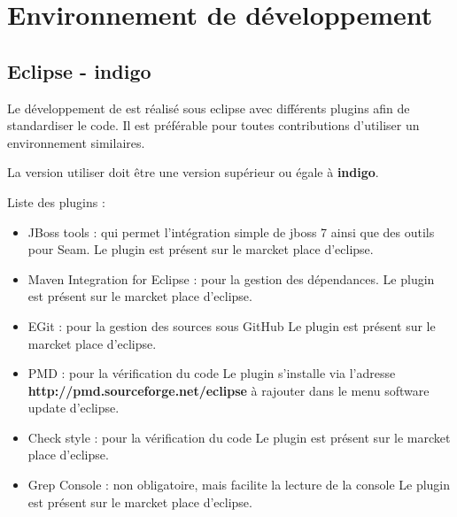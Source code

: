 \newpage{}
\chapter{Environnement de développement}

\section{Eclipse - indigo}
Le développement de \youTestIt{} est réalisé sous eclipse avec différents plugins afin de standardiser 
le code. Il est préférable pour toutes contributions d'utiliser un environnement similaires.

La version utiliser doit être une version supérieur ou égale à \textbf{indigo}. 

Liste des plugins :
\begin{itemize}
	\item JBoss tools : qui permet l'intégration simple de jboss 7 ainsi que des outils pour Seam.
				Le plugin est présent sur le marcket place d'eclipse.
				
	\item Maven Integration for Eclipse : pour la gestion des dépendances.
					Le plugin est présent sur le marcket place d'eclipse.
					
	\item EGit : pour la gestion des sources sous GitHub
					Le plugin est présent sur le marcket place d'eclipse.
					
	\item PMD : pour la vérification du code
					Le plugin s'installe via l'adresse \textbf{http://pmd.sourceforge.net/eclipse } à rajouter dans 
					le menu software update d'eclipse.
					
	\item Check style : pour la vérification du code
					Le plugin est présent sur le marcket place d'eclipse.
					
	\item Grep Console : non obligatoire, mais facilite la lecture de la console
					Le plugin est présent sur le marcket place d'eclipse.
\end{itemize}

